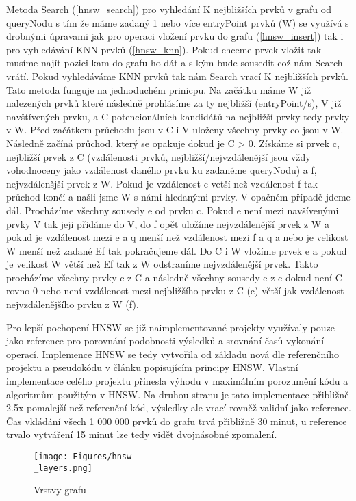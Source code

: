 \documentclass[czech,semestral,dept460,male,csharp,cpdeclaration]{diploma}
\begin{document}
		Metoda Search (\ref{hnsw_search}) pro vyhledání K nejbližších prvků v grafu od queryNodu s tím že máme zadaný 1 nebo více entryPoint prvků (W) se využívá s drobnými úpravami jak pro operaci vložení prvku do grafu (\ref{hnsw_insert}) tak i pro vyhledávání KNN prvků (\ref{hnsw_knn}). Pokud chceme prvek vložit tak musíme najít pozici kam do grafu ho dát a s kým bude sousedit což nám Search vrátí. Pokud vyhledáváme KNN prvků tak nám Search vrací K nejbližších prvků. Tato metoda funguje na jednoduchém prinicpu. Na začátku máme W již nalezených prvků které následně prohlásíme za ty nejbližší (entryPoint/s), V již navštívených prvku, a C potencionálních kandidátů na nejbližší prvky tedy prvky v W. Před začátkem průchodu jsou v C i V uloženy všechny prvky co jsou v W. Následně začíná průchod, který se opakuje dokud je C > 0. Získáme si prvek c, nejbližší prvek z C (vzdálenosti prvků, nejbližší/nejvzdálenější jsou vždy vohodnoceny jako vzdálenost daného prvku ku zadanéme queryNodu) a f, nejvzdálenšjší prvek z W. Pokud je vzdálenost c vetší než vzdálenost f tak průchod končí a našli jsme W s námi hledanými prvky. V opačném případě jdeme dál. Procházíme všechny sousedy e od prvku c. Pokud e není mezi navšívenými prvky V tak jeji přidáme do V, do f opět uložíme nejvzdálenější prvek z W a pokud je vzdálenost mezi e a q menší než vzdálenost mezi f a q a nebo je velikost W menší než zadané Ef tak pokračujeme dál. Do C i W vložíme prvek e a pokud je velikost W větší než Ef tak z W odstraníme nejvzdálenější prvek. Takto procházíme všechny prvky c z C a následně všechny sousedy e z c dokud není C rovno 0 nebo není vzdálenost mezi nejbližšího prvku z C (c) větší jak vzdálenost nejvzdálenějšího prvku z W (f).
	
		Pro lepší pochopení HNSW se již naimplementované projekty \cite{git-hnswlib} \cite{git-hnsw} využívaly pouze jako reference pro porovnání podobnosti výsledků a srovnání časů vykonání operací. Implemence HNSW se tedy vytvořila od základu nová dle referenčního projektu a pseudokódu v článku popisujícím principy HNSW. Vlastní implementace celého projektu přinesla výhodu v maximálním porozumění kódu a algoritmům použitým v HNSW. Na druhou stranu je tato implementace přibližně 2.5x pomalejší než referenční kód, výsledky ale vrací rovněž validní jako reference. Čas vkládání všech 1 000 000 prvků do grafu trvá přibližně 30 minut, u reference trvalo vytváření 15 minut lze tedy vidět dvojnásobné zpomalení.
		
		\begin{figure}
			\centering
			\texttt{[image: Figures/hnsw\\\_layers.png]}
			\caption{Vrstvy grafu}
			\label{hnsw_layers}
		\end{figure}
		
\end{document}
